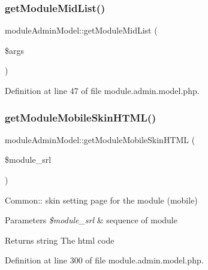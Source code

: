 \mbox{\label{classmoduleAdminModel_af1e58f7c102a8ee238f25ff2b193e6d7}} 
\subsubsection{\texorpdfstring{get\+Module\+Mid\+List()}{getModuleMidList()}}
{\footnotesize\ttfamily module\+Admin\+Model\+::get\+Module\+Mid\+List (\begin{DoxyParamCaption}\item[{}]{\$args }\end{DoxyParamCaption})}



Definition at line 47 of file module.\+admin.\+model.\+php.

\mbox{\label{classmoduleAdminModel_a38c85d9c28facff15f1c54ebe1e5b70b}} 
\subsubsection{\texorpdfstring{get\+Module\+Mobile\+Skin\+H\+T\+M\+L()}{getModuleMobileSkinHTML()}}
{\footnotesize\ttfamily module\+Admin\+Model\+::get\+Module\+Mobile\+Skin\+H\+T\+ML (\begin{DoxyParamCaption}\item[{}]{\$module\+\_\+srl }\end{DoxyParamCaption})}

Common\+:\+: skin setting page for the module (mobile)


\begin{DoxyParams}{Parameters}
{\em \$module\+\_\+srl} & sequence of module \\
\hline
\end{DoxyParams}
\begin{DoxyReturn}{Returns}
string The html code 
\end{DoxyReturn}


Definition at line 300 of file module.\+admin.\+model.\+php.

